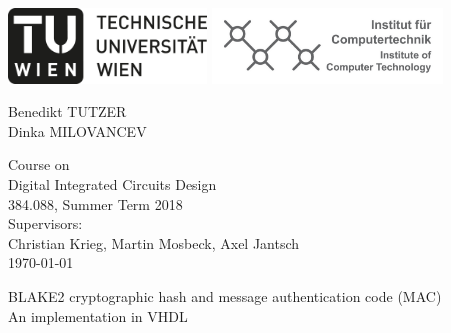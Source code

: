\documentclass[%
	a4paper,
]
{article}
\begin{document}
%
\begin{titlepage}

	\begin{center}

	\includegraphics[height=2cm]{fig/logo-tu-bw.png}%
	\hfill{}%
	\includegraphics[height=2cm]{fig/logo-ict.png}%
	

	\vspace{5em}


		\large
		Benedikt TUTZER\\
		Dinka MILOVANCEV\\
	

	\vspace{5em}

		Course on \\[1em]
		{\huge Digital Integrated Circuits Design}\\[1em]
		{\Large 384.088, Summer Term 2018} \\[2em]
		{\large Supervisors:\\[.5em]
			Christian Krieg, Martin Mosbeck, Axel Jantsch} \\[5em]

		\today
		\vspace{5em}

		{\Huge BLAKE2 cryptographic hash and message authentication code (MAC)}\\[2em]
		{\Large An implementation in VHDL}

		\vspace{3em}
	\end{center}


\begin{abstract}

We implemented \emph{BLAKE2b} and \emph{BLAKE2s} hash function as specified in
RFC 7693. We used state machines to implement \emph{BLAKE2}.
Functional correctness is verified by comparing the produced output to the
reference implementation given in C. Our test bench compares the output of our
entity with the reference hash value for the same message input and reports
the result to stdout.
\end{abstract}
\end{titlepage}
%
%
\end{document}
